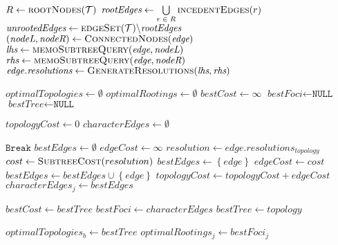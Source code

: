 \documentclass[12pt]{article}
\begin{document}
{\begin{algorithm}
\begin{algorithmic}[1]
		\State $R \gets \Call{rootNodes}{\mathcal{T}}$
		\State $\textit{rootEdges} \gets \bigcup\limits_{r\; \in\; R} \Call{incedentEdges}{r}$
		\State $\textit{unrootedEdges} \gets \Call{edgeSet}{\mathcal{T}} \backslash \textit{rootEdges}$
		  \State $(\textit{nodeL}, \textit{nodeR}) \gets \Call{ConnectedNodes}{\textit{edge}}$
		  \State $\textit{lhs} \gets \Call{memoSubtreeQuery}{\textit{edge}, \textit{nodeL}}$
		  \State $\textit{rhs} \gets \Call{memoSubtreeQuery}{\textit{edge}, \textit{nodeR}}$
		  \State $\textit{edge.resolutions} \gets \Call{GenerateResolutions}{\textit{lhs}, \textit{rhs}}$
		\EndFor
		
		\State $\textit{optimalTopologies} \gets \emptyset$
		\State $\textit{optimalRootings}   \gets \emptyset$
		    \State $\textit{bestCost} \gets \infty$
		    \State $\textit{bestFoci} \gets \texttt{NULL}$
		    \State $\textit{bestTree} \gets \texttt{NULL}$
		    
			  \State $\textit{topologyCost}   \gets 0$
			  \State $\textit{characterEdges} \gets \emptyset$			  
			  
			     
			    \State $\texttt{Break}$
			    \EndIf
		        \State $\textit{bestEdges} \gets \emptyset$
		        \State $\textit{edgeCost} \gets \infty$
			      \State $resolution \gets edge.resolutions_{topology}$
			      \State $cost \gets \Call{SubtreeCost}{resolution}$
			        \State $\textit{bestEdges} \gets \left\{ edge \right\}$
			        \State $\textit{edgeCost} \gets cost$
				      \State $bestEdges \gets bestEdges \cup \left\{ edge \right\}$
			      \EndIf
			    \EndFor
			 	\State $topologyCost \gets topologyCost + edgeCost$
			 	\State $characterEdges_j \gets bestEdges$
			 	
              \EndFor
                  \State $bestCost \gets bestTree$
                  \State $bestFoci \gets characterEdges$
                  \State $bestTree \gets topology$
				\EndIf

			\EndFor
			\State $optimalTopologies_b \gets bestTree$
			    \State $optimalRootings_j \gets bestFoci_j$
			  \EndIf
			\EndFor


\end{algorithmic}
\end{algorithm}}
\end{document}
